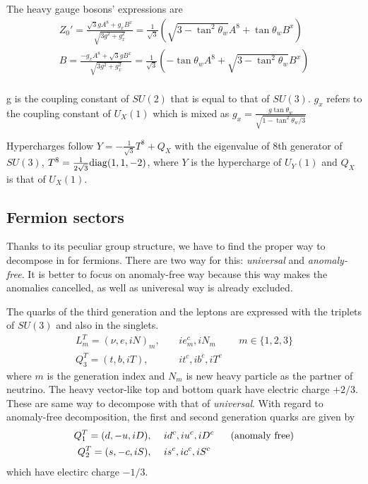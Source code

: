 The heavy gauge bosons' expressions are 
\begin{align}
 Z_0'=\frac{\sqrt{3}g A^8 + g_x B^x}{\sqrt{3 g^2 + g_x ^2}} 
 = \frac{1}{\sqrt{3}}(\sqrt{3-\tan^2\theta_w}A^8 + \tan\theta_w B^x) \\
 B=\frac{-g_x A^8 + \sqrt{3}g B^x}{\sqrt{3 g^2 + g_x ^2}} 
 = \frac{1}{\sqrt{3}}(-\tan\theta_w A^8 + \sqrt{3-\tan^2\theta_w} B^x) \\
\end{align}

g is the coupling constant of $SU(2)$ that is equal to that of $SU(3)$.
$g_x$ refers to the coupling constant of $U_X(1)$ which is mixed as 
$g_x = \frac{g \tan\theta_w}{\sqrt{1-\tan^2\theta_w / 3}}$

Hypercharges follow $Y=-\frac{1}{\sqrt{3}}T^8 + Q_X$
with the eigenvalue of 8th generator of $SU(3)$,  $T^8=\frac{1}{2\sqrt{3}}{\rm{diag}}(1,1,-2)$,
where $Y$ is the hypercharge of $U_Y(1)$ and $Q_X$ is that of $U_X(1)$.



\subsection*{Fermion sectors}
Thanks to its peculiar group structure, we have to find the proper way to 
decompose in for fermions. 
There are two way for this: \emph{universal} and \emph{anomaly-free}.
It is better to focus on anomaly-free way because this way makes the anomalies cancelled, 
as well as univeresal way is already excluded.

The quarks of the third generation and the leptons are expressed with the triplets of $SU(3)$ and also in the singlets. 
\begin{align}
 L_m^T=(\nu,e,iN)_m,~~&~~~ ie_m^c, iN_m~~&~~{m\in\{1,2,3\}} \nonumber\\
 Q_3^T= (t,b,iT), ~~&~~~it^c, ib^c,iT^c ~~&~ 
\end{align}
where $m$ is the generation index and $N_m$ is new heavy particle as the partner of neutrino. 
The heavy vector-like top and bottom quark have electric charge $+2/3$.
These are same way to decompose with that of \emph{universal}.
With regard to anomaly-free decomposition, the first and second generation quarks are given by 
\begin{align}
 Q_1^T= (d,-u,iD), ~~ &~~  id^c, iu^c, iD^c ~~& ({\rm{anomaly~free}})\nonumber\\
 Q_2^T= (s,-c,iS),~~ &~~ is^c, ic^c, iS^c ~~ & ~~
\end{align}
which have electirc charge $-1/3$.

